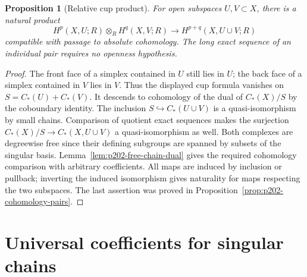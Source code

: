 \documentclass[11pt,oneside,openany]{book}
\theoremstyle{plain}
\newtheorem{proposition}[theorem]{Proposition}
\theoremstyle{definition}
\theoremstyle{remark}
\begin{document}
\begin{proposition}[Relative cup product]\label{prop:p202-relative-cup}
For open subspaces \(U,V\subset X\), there is a natural
product
\[
 H^p(X,U;R)\otimes_R H^q(X,V;R)
     \longrightarrow H^{p+q}(X,U\cup V;R)
\]
compatible with passage to absolute cohomology. The long
exact sequence of an individual pair requires no openness
hypothesis.
\end{proposition}
\begin{proof}
The front face of a simplex contained in \(U\) still lies
in \(U\); the back face of a simplex contained in \(V\)
lies in \(V\). Thus the displayed cup formula vanishes on
\(S=C_*(U)+C_*(V)\). It descends to cohomology of the dual
of \(C_*(X)/S\) by the coboundary identity. The inclusion
\(S\hookrightarrow C_*(U\cup V)\) is a quasi-isomorphism
by small chains. Comparison of quotient exact sequences
makes the surjection \(C_*(X)/S\to C_*(X,U\cup V)\) a
quasi-isomorphism as well. Both complexes are degreewise free
since their defining subgroups are spanned by subsets of the
singular basis. Lemma~\ref{lem:p202-free-chain-dual} gives
the required cohomology comparison with arbitrary coefficients.
All maps are induced by inclusion or pullback; inverting
the induced isomorphism gives naturality for maps respecting
the two subspaces. The last assertion was proved in
Proposition~\ref{prop:p202-cohomology-pairs}.
\end{proof}

\section{Universal coefficients for singular chains}\label{p202:T27}
\end{document}
